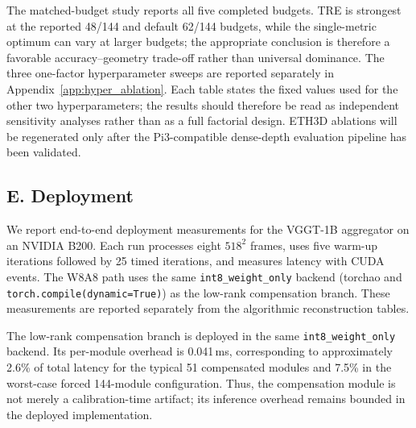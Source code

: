 \documentclass[journal]{Tail_Aware_Post_Training_Quantization_for_3D_Geometry_Models_TMM/IEEEtran}
\begin{document}
The matched-budget study reports all five completed budgets. TRE is strongest at the reported 48/144 and default 62/144 budgets, while the single-metric optimum can vary at larger budgets; the appropriate conclusion is therefore a favorable accuracy--geometry trade-off rather than universal dominance. The three one-factor hyperparameter sweeps are reported separately in Appendix~\ref{app:hyper_ablation}. Each table states the fixed values used for the other two hyperparameters; the results should therefore be read as independent sensitivity analyses rather than as a full factorial design. ETH3D ablations will be regenerated only after the Pi3-compatible dense-depth evaluation pipeline has been validated.

\subsection{E. Deployment}

We report end-to-end deployment measurements for the VGGT-1B aggregator on an NVIDIA B200. Each run processes eight $518^2$ frames, uses five warm-up iterations followed by 25 timed iterations, and measures latency with CUDA events. The W8A8 path uses the same \texttt{int8\_weight\_only} backend (torchao and \texttt{torch.compile(dynamic=True)}) as the low-rank compensation branch. These measurements are reported separately from the algorithmic reconstruction tables.

\begin{table}[t]
\caption{End-to-end VGGT-1B deployment on NVIDIA B200 with eight $518^2$ frames. Latency is measured after five warm-up iterations over 25 timed iterations using CUDA events. $W$ denotes quantized weight storage and Peak denotes peak GPU memory.}
\label{tab:deployment}
\centering
\scriptsize
\setlength{\tabcolsep}{3pt}
\end{table}

The low-rank compensation branch is deployed in the same \texttt{int8\_weight\_only} backend. Its per-module overhead is 0.041\,ms, corresponding to approximately 2.6\% of total latency for the typical 51 compensated modules and 7.5\% in the worst-case forced 144-module configuration. Thus, the compensation module is not merely a calibration-time artifact; its inference overhead remains bounded in the deployed implementation.
\end{document}
